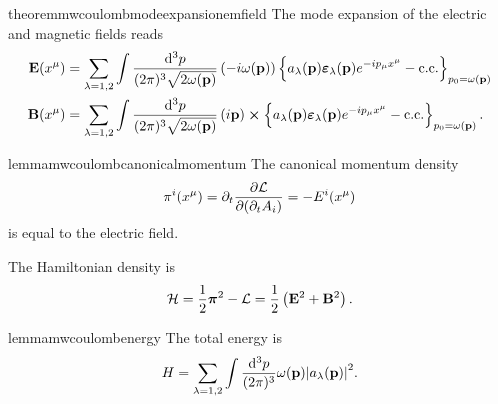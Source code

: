 \begin{restatable}{theorem}{mwcoulombmodeexpansionemfield}\label{thm:mw_coulomb_mode_expansion_em_field}
	The mode expansion of the electric and magnetic fields reads
	\begin{align}
		\vb{E}(x^\mu)
		&=
		\sum_{\lambda=1,2}
		\int\frac{\dd[3]{p}}{(2\pi)^3\sqrt{2\omega(\vb{p})}}
		\left(
			-i
			\omega(\vb{p})
		\right)
		\left\{
			a_\lambda(\vb{p})
			\boldsymbol{\varepsilon}_\lambda(\vb{p})
			e^{-ip_\mu x^\mu}
			-
			\text{c.c.}
		\right\}_{p_0=\omega(\vb{p})}
		\\
		\vb{B}(x^\mu)
		&=
		\sum_{\lambda=1,2}
		\int\frac{\dd[3]{p}}{(2\pi)^3\sqrt{2\omega(\vb{p})}}
		\left(
			i\vb{p}
		\right)
		\cross
		\left\{
			a_\lambda(\vb{p})
			\boldsymbol{\varepsilon}_\lambda(\vb{p})
			e^{-ip_\mu x^\mu}
			-
			\text{c.c.}
		\right\}_{p_0=\omega(\vb{p})}
		\label{eq:mw_coulomb_mode_expansion_em_field}
		.
	\end{align}
\end{restatable}
\begin{restatable}{lemma}{mwcoulombcanonicalmomentum}\label{thm:mw_coulomb_canonical_momentum}
	The canonical momentum density
	\begin{equation}
		\pi^i(x^\mu)
		=
		\partial_t
		\pdv{\mathcal{L}}{(\partial_tA_i)}
		=
		-
		E^i(x^\mu)
		\label{eq:mw_coulomb_canonical_momentum}
	\end{equation}
	is equal to the electric field.
\end{restatable}
\begin{corollary}\label{thm:mw_coulomb_hamiltonian}
	The Hamiltonian density is
	\begin{equation}
		\mathcal{H}
		=
		\frac{1}{2}
		\boldsymbol{\pi}^2
		-
		\mathcal{L}
		=
		\frac{1}{2}
		\left(
			\vb{E}^2
			+
			\vb{B}^2
		\right)
		\label{thm:mw_hamiltonian}
		.
	\end{equation}
\end{corollary}
\begin{restatable}{lemma}{mwcoulombenergy}\label{thm:mw_coulomb_energy}
	The total energy is
	\begin{equation}
		H
		=
		\sum_{\lambda=1,2}
		\int\frac{\dd[3]{p}}{(2\pi)^3}
		\omega(\vb{p})
		\abs{a_\lambda(\vb{p})}^2
		\label{thm:mw_coulomb_energy}
		.
	\end{equation}
\end{restatable}